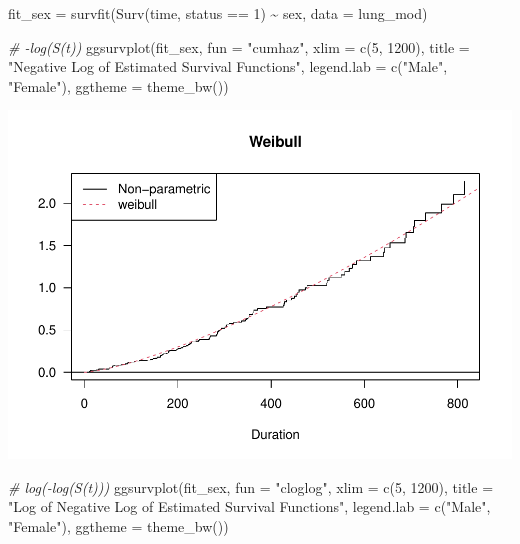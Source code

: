 \documentclass[
]{article}
\newenvironment{Shaded}{\begin{snugshade}}{\end{snugshade}}
\newcommand{\AttributeTok}[1]{\textcolor[rgb]{0.77,0.63,0.00}{#1}}
\newcommand{\CommentTok}[1]{\textcolor[rgb]{0.56,0.35,0.01}{\textit{#1}}}
\newcommand{\DecValTok}[1]{\textcolor[rgb]{0.00,0.00,0.81}{#1}}
\newcommand{\FunctionTok}[1]{\textcolor[rgb]{0.00,0.00,0.00}{#1}}
\newcommand{\NormalTok}[1]{#1}
\newcommand{\OtherTok}[1]{\textcolor[rgb]{0.56,0.35,0.01}{#1}}
\newcommand{\SpecialCharTok}[1]{\textcolor[rgb]{0.00,0.00,0.00}{#1}}
\newcommand{\StringTok}[1]{\textcolor[rgb]{0.31,0.60,0.02}{#1}}
\begin{document}
\begin{Shaded}
\begin{Highlighting}[]
\NormalTok{fit\_sex }\OtherTok{=} \FunctionTok{survfit}\NormalTok{(}\FunctionTok{Surv}\NormalTok{(time, status }\SpecialCharTok{==} \DecValTok{1}\NormalTok{) }\SpecialCharTok{\textasciitilde{}}\NormalTok{ sex, }\AttributeTok{data =}\NormalTok{ lung\_mod)}

\CommentTok{\# {-}log(S(t))}
\FunctionTok{ggsurvplot}\NormalTok{(fit\_sex, }
           \AttributeTok{fun =} \StringTok{"cumhaz"}\NormalTok{,}
           \AttributeTok{xlim =} \FunctionTok{c}\NormalTok{(}\DecValTok{5}\NormalTok{, }\DecValTok{1200}\NormalTok{),}
           \AttributeTok{title =} \StringTok{"Negative Log of Estimated Survival Functions"}\NormalTok{,}
           \AttributeTok{legend.lab =} \FunctionTok{c}\NormalTok{(}\StringTok{"Male"}\NormalTok{, }\StringTok{"Female"}\NormalTok{),}
           \AttributeTok{ggtheme =} \FunctionTok{theme\_bw}\NormalTok{())}
\end{Highlighting}
\end{Shaded}

\includegraphics{final_project_files/figure-latex/unnamed-chunk-41-1.pdf}

\begin{Shaded}
\begin{Highlighting}[]
\CommentTok{\# log({-}log(S(t)))}
\FunctionTok{ggsurvplot}\NormalTok{(fit\_sex, }
           \AttributeTok{fun =} \StringTok{"cloglog"}\NormalTok{,}
           \AttributeTok{xlim =} \FunctionTok{c}\NormalTok{(}\DecValTok{5}\NormalTok{, }\DecValTok{1200}\NormalTok{),}
           \AttributeTok{title =} \StringTok{"Log of Negative Log of Estimated Survival Functions"}\NormalTok{,}
           \AttributeTok{legend.lab =} \FunctionTok{c}\NormalTok{(}\StringTok{"Male"}\NormalTok{, }\StringTok{"Female"}\NormalTok{),}
           \AttributeTok{ggtheme =} \FunctionTok{theme\_bw}\NormalTok{())}
\end{Highlighting}
\end{Shaded}
\end{document}
